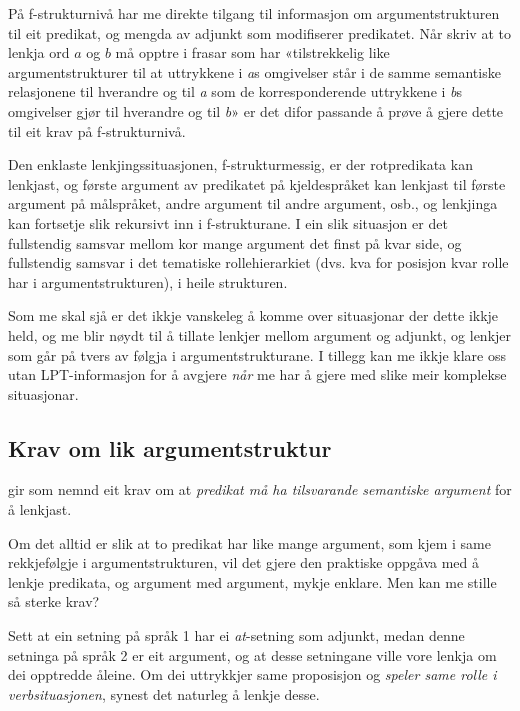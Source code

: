 \documentclass[11pt,a4paper,oneside,draft]{book}
\begin{document}
 
På f-strukturnivå har me direkte tilgang til informasjon om
argumentstrukturen til eit predikat, og mengda av adjunkt som
modifiserer predikatet. Når \citet[s.~3]{thunes2003eal} skriv at to
lenkja ord $a$ og $b$ må opptre i frasar som har «tilstrekkelig like
argumentstrukturer til at uttrykkene i \emph{a}s omgivelser står i de
samme semantiske relasjonene til hverandre og til \emph{a} som de
korresponderende uttrykkene i \emph{b}s omgivelser gjør til hverandre
og til \emph{b}» er det difor passande å prøve å gjere dette til eit
krav på f-strukturnivå.

Den enklaste lenkjingssituasjonen, f-strukturmessig, er der
rotpredikata kan lenkjast, og første argument av predikatet på
kjeldespråket kan lenkjast til første argument på målspråket, andre
argument til andre argument, osb., og lenkjinga kan fortsetje slik
rekursivt inn i f-strukturane. I ein slik situasjon er det fullstendig
samsvar mellom kor mange argument det finst på kvar side, og
fullstendig samsvar i det tematiske rollehierarkiet (dvs. kva for
posisjon kvar rolle har i argumentstrukturen), i heile strukturen.

Som me skal sjå er det ikkje vanskeleg å komme over situasjonar der
dette ikkje held, og me blir nøydt til å tillate lenkjer mellom
argument og adjunkt, og lenkjer som går på tvers av følgja i
argumentstrukturane. I tillegg kan me ikkje klare oss utan
LPT-informasjon for å avgjere \emph{når} me har å gjere med slike meir
komplekse situasjonar. 
\subsection{Krav om lik argumentstruktur}
\label{sec-3.6.1}

\label{SEC:lik-argstr}

\citet{thunes2003eal} gir som nemnd eit krav om at \emph{predikat må ha tilsvarande semantiske argument} for å lenkjast.

Om det alltid er slik at to predikat har like mange argument, som kjem i
same rekkjefølgje i argumentstrukturen, vil det gjere den praktiske
oppgåva med å lenkje predikata, og argument med argument, mykje
enklare. Men kan me stille så sterke krav?

Sett at ein setning på språk 1 har ei \emph{at}-setning som adjunkt, medan
denne setninga på språk 2 er eit argument, og at desse setningane
ville vore lenkja om dei opptredde åleine. Om dei uttrykkjer same
proposisjon og \emph{speler same rolle i verbsituasjonen},
synest det naturleg å lenkje desse.  
\end{document}

